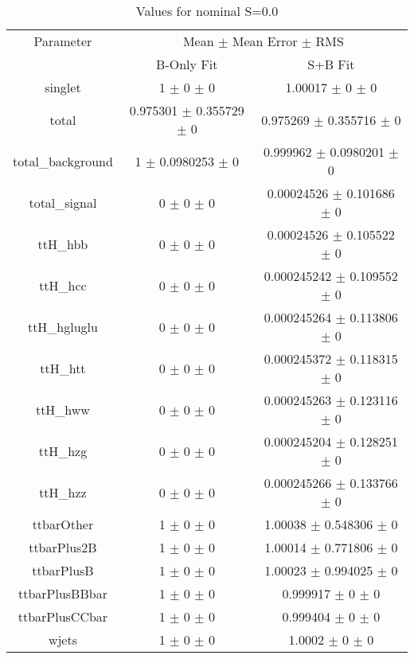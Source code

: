 \begin{table}
\centering
\caption{Values for nominal S=0.0}
\begin{tabular}{ccc}
\toprule
Parameter & \multicolumn{2}{c}{Mean $\pm$ Mean Error $\pm$ RMS}\\
 & B-Only Fit & S+B Fit\\
\midrule
singlet & \num{1} $\pm$ \num{0} $\pm$ \num{0} & \num{1.00017} $\pm$ \num{0} $\pm$ \num{0}\\
total & \num{0.975301} $\pm$ \num{0.355729} $\pm$ \num{0} & \num{0.975269} $\pm$ \num{0.355716} $\pm$ \num{0}\\
total\_background & \num{1} $\pm$ \num{0.0980253} $\pm$ \num{0} & \num{0.999962} $\pm$ \num{0.0980201} $\pm$ \num{0}\\
total\_signal & \num{0} $\pm$ \num{0} $\pm$ \num{0} & \num{0.00024526} $\pm$ \num{0.101686} $\pm$ \num{0}\\
ttH\_hbb & \num{0} $\pm$ \num{0} $\pm$ \num{0} & \num{0.00024526} $\pm$ \num{0.105522} $\pm$ \num{0}\\
ttH\_hcc & \num{0} $\pm$ \num{0} $\pm$ \num{0} & \num{0.000245242} $\pm$ \num{0.109552} $\pm$ \num{0}\\
ttH\_hgluglu & \num{0} $\pm$ \num{0} $\pm$ \num{0} & \num{0.000245264} $\pm$ \num{0.113806} $\pm$ \num{0}\\
ttH\_htt & \num{0} $\pm$ \num{0} $\pm$ \num{0} & \num{0.000245372} $\pm$ \num{0.118315} $\pm$ \num{0}\\
ttH\_hww & \num{0} $\pm$ \num{0} $\pm$ \num{0} & \num{0.000245263} $\pm$ \num{0.123116} $\pm$ \num{0}\\
ttH\_hzg & \num{0} $\pm$ \num{0} $\pm$ \num{0} & \num{0.000245204} $\pm$ \num{0.128251} $\pm$ \num{0}\\
ttH\_hzz & \num{0} $\pm$ \num{0} $\pm$ \num{0} & \num{0.000245266} $\pm$ \num{0.133766} $\pm$ \num{0}\\
ttbarOther & \num{1} $\pm$ \num{0} $\pm$ \num{0} & \num{1.00038} $\pm$ \num{0.548306} $\pm$ \num{0}\\
ttbarPlus2B & \num{1} $\pm$ \num{0} $\pm$ \num{0} & \num{1.00014} $\pm$ \num{0.771806} $\pm$ \num{0}\\
ttbarPlusB & \num{1} $\pm$ \num{0} $\pm$ \num{0} & \num{1.00023} $\pm$ \num{0.994025} $\pm$ \num{0}\\
ttbarPlusBBbar & \num{1} $\pm$ \num{0} $\pm$ \num{0} & \num{0.999917} $\pm$ \num{0} $\pm$ \num{0}\\
ttbarPlusCCbar & \num{1} $\pm$ \num{0} $\pm$ \num{0} & \num{0.999404} $\pm$ \num{0} $\pm$ \num{0}\\
wjets & \num{1} $\pm$ \num{0} $\pm$ \num{0} & \num{1.0002} $\pm$ \num{0} $\pm$ \num{0}\\
\bottomrule
\end{tabular}
\end{table}